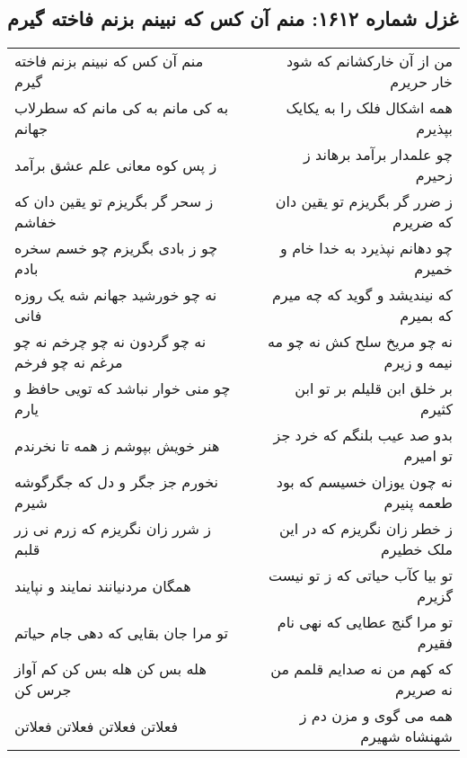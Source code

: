 \begin{center}
\section*{غزل شماره ۱۶۱۲: منم آن کس که نبینم بزنم فاخته گیرم}
\label{sec:1612}
\begin{longtable}{l p{0.5cm} r}
منم آن کس که نبینم بزنم فاخته گیرم
&&
من از آن خارکشانم که شود خار حریرم
\\
به کی مانم به کی مانم که سطرلاب جهانم
&&
همه اشکال فلک را به یکایک بپذیرم
\\
ز پس کوه معانی علم عشق برآمد
&&
چو علمدار برآمد برهاند ز زحیرم
\\
ز سحر گر بگریزم تو یقین دان که خفاشم
&&
ز ضرر گر بگریزم تو یقین دان که ضریرم
\\
چو ز بادی بگریزم چو خسم سخره بادم
&&
چو دهانم نپذیرد به خدا خام و خمیرم
\\
نه چو خورشید جهانم شه یک روزه فانی
&&
که نیندیشد و گوید که چه میرم که بمیرم
\\
نه چو گردون نه چو چرخم نه چو مرغم نه چو فرخم
&&
نه چو مریخ سلح کش نه چو مه نیمه و زیرم
\\
چو منی خوار نباشد که تویی حافظ و یارم
&&
بر خلق ابن قلیلم بر تو ابن کثیرم
\\
هنر خویش بپوشم ز همه تا نخرندم
&&
بدو صد عیب بلنگم که خرد جز تو امیرم
\\
نخورم جز جگر و دل که جگرگوشه شیرم
&&
نه چون یوزان خسیسم که بود طعمه پنیرم
\\
ز شرر زان نگریزم که زرم نی زر قلبم
&&
ز خطر زان نگریزم که در این ملک خطیرم
\\
همگان مردنیانند نمایند و نپایند
&&
تو بیا کآب حیاتی که ز تو نیست گزیرم
\\
تو مرا جان بقایی که دهی جام حیاتم
&&
تو مرا گنج عطایی که نهی نام فقیرم
\\
هله بس کن هله بس کن کم آواز جرس کن
&&
که کهم من نه صدایم قلمم من نه صریرم
\\
فعلاتن فعلاتن فعلاتن فعلاتن
&&
همه می گوی و مزن دم ز شهنشاه شهیرم
\\
\end{longtable}
\end{center}
